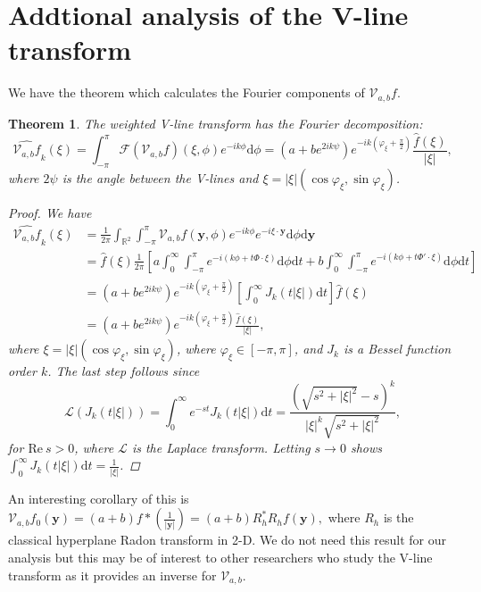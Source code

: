 \documentclass[a4paper,12pt]{amsart}
\numberwithin{equation}{section}
\theoremstyle{plain}
\newtheorem{theorem}{Theorem}
\numberwithin{theorem}{section}
\theoremstyle{definition}
\theoremstyle{remark}
\theoremstyle{remark}
\theoremstyle{remark}
\newcommand{\paren}[1]{\left(#1\right)}               %
\newcommand{\vy}{{\mathbf{y}}}
\begin{document}
\section{Addtional analysis of the V-line transform}
\label{add_vline}
We have the theorem which calculates the Fourier components of $\mathcal{V}_{a,b}f$.
\begin{theorem}
The weighted V-line transform has the Fourier decomposition:
\begin{equation}
\widehat{ \mathcal{V}_{a,b} f}_k(\xi) = \int_{-\pi}^\pi  \mathcal{F}\paren{\mathcal{V}_{a,b} f}(\xi, \phi) e^{-i k \phi} \mathrm{d}\phi = \paren{a + be^{2 i k\psi}}e^{-ik(\varphi_{\xi} + \frac{\pi}{2})} \frac{\hat{f}(\xi)}{|\xi|},
\end{equation}
where $2\psi$ is the angle between the V-lines and $\xi = |\xi|(\cos\varphi_{\xi}, \sin\varphi_{\xi})$.
\begin{proof}
We have
\begin{equation}
\label{fourier}
\begin{split}
\widehat{ \mathcal{V}_{a,b} f}_k(\xi) &= \frac{1}{2\pi}\int_{\mathbb{R}^2}\int_{-\pi}^{\pi}\mathcal{V}_{a,b}f(\vy,\phi)e^{-i k \phi} e^{-i \xi \cdot \vy} \mathrm{d}\phi \mathrm{d}\vy\\
&= \hat{f}(\xi)\frac{1}{2\pi} \left[a\int_0^\infty \int_{-\pi}^{\pi}e^{-i\paren{ k\phi + t\Phi\cdot\xi }}\mathrm{d}\phi\mathrm{d}t + b\int_0^\infty \int_{-\pi}^{\pi}e^{-i\paren{ k\phi + t\Phi'\cdot\xi }}\mathrm{d}\phi\mathrm{d}t \right]\\
& = \paren{a+be^{2ik\psi}}e^{-ik(\varphi_{\xi} + \frac{\pi}{2})} \left[\int_0^\infty J_k(t|\xi|)\mathrm{d}t\right] \hat{f}(\xi)\\
& = \paren{a+be^{2ik\psi}}e^{-ik(\varphi_{\xi} + \frac{\pi}{2})} \frac{\hat{f}(\xi)}{|\xi|},
\end{split}
\end{equation}
where  $\xi = |\xi|(\cos\varphi_{\xi},\sin\varphi_{\xi})$, where $\varphi_{\xi} \in [-\pi,\pi]$, and $J_k$ is a Bessel function order $k$. The last step follows since
$$\mathcal{L}(J_k(t|\xi|)) = \int_0^\infty e^{-st}J_k(t|\xi|)\mathrm{d}t = \frac{\paren{\sqrt{s^2+|\xi|^2} - s}^k}{|\xi|^k\sqrt{s^2+|\xi|^2}},$$
for $\text{Re}\ s > 0$, where $\mathcal{L}$ is the Laplace transform. Letting $s\to 0$ shows $\int_0^\infty J_k(t|\xi|)\mathrm{d}t = \frac{1}{|\xi|}$.
\end{proof}
\end{theorem}
An interesting corollary of this is $\mathcal{V}_{a,b}f_0(\vy) = (a+b) f \ast \paren{\frac{1}{|\vy|}} = (a+b)R_h^*R_hf(\vy),$ where $R_h$ is the classical hyperplane Radon transform in 2-D. We do not need this result for our analysis but this may be of interest to other researchers who study the V-line transform as it provides an inverse for $\mathcal{V}_{a,b}$. 
\end{document}
